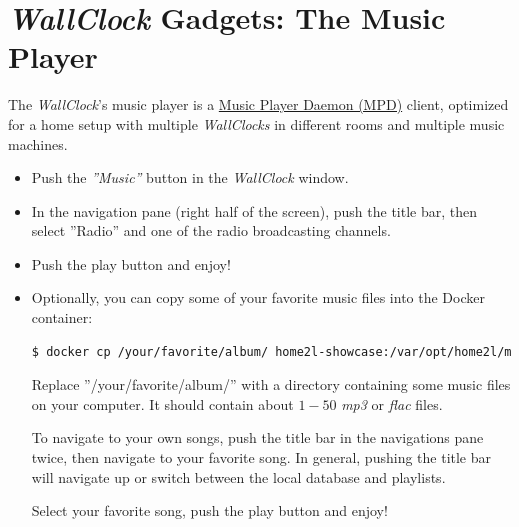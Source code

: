 \documentclass[12pt,english,parskip=half,headheight=19pt]{scrreprt}
\begin{document}
\clearpage
\section{\textit{WallClock} Gadgets: The Music Player}
\label{sec:tutorial-wallclock}


The \textit{WallClock}'s music player is a \href{https://www.musicpd.org/}{Music Player Daemon (MPD)} client, optimized for a home setup with multiple \textit{WallClocks} in different rooms and multiple music machines.

\begin{itemize}[$\blacktriangleright$]
\item
  Push the \textit{''Music''} button in the \textit{WallClock} window.

\item
  In the navigation pane (right half of the screen), push the title
  bar, then select ''Radio'' and one of the radio broadcasting channels.

\item
  Push the play button and enjoy!

\item
  Optionally, you can copy some of your favorite music files into the
  Docker container:
  \begin{lstlisting}[language=bash]
    $ docker cp /your/favorite/album/ home2l-showcase:/var/opt/home2l/mpd/music/
  \end{lstlisting}
  Replace ''/your/favorite/album/'' with a directory containing some music files on your computer.
  It should contain about $1 - 50$ \textit{mp3} or \textit{flac} files.

  To navigate to your own songs, push the title bar in the navigations
  pane twice, then navigate to your favorite song. In general,
  pushing the title bar will navigate up or switch between the local
  database and playlists.

  Select your favorite song, push the play button and enjoy!

\end{itemize}
\end{document}
